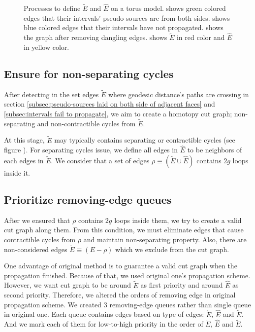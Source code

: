\documentclass[a4paper,twoside]{article}
\begin{document}
\begin{figure}[h!]
	\caption[]{Processes to define $\tilde{E}$ and $\hat{E}$ on a torus model.  shows green colored edges that their intervals' pseudo-sources are from both sides.  shows blue colored edges that their intervals have not propagated.  shows the graph after removing dangling edges.  shows $\tilde{E}$ in red color and $\hat{E}$ in  yellow color.}
	\label{fig:fig-torus_edges_detected}
\end{figure}

\subsection{Ensure for non-separating cycles}
\label{subsec:ensure non-trivia}
After detecting in the set edges $\tilde{E}$ where geodesic distance's paths are crossing in section \ref{subsec:pseudo-sources laid on both side of adjacent faces} and \ref{subsec:intervals fail to propagate}, we aim to create a homotopy cut graph; non-separating and non-contractible cycles from $\tilde{E}$.

At this stage, $\tilde{E}$ may typically contains separating or contractible cycles (see figure ).  For separating cycles issue, we define all edges in $\hat{E}$ to be neighbors of each edges in $\tilde{E}$. We consider that a set of edges $\rho \equiv (\tilde{E} \cup \hat{E})$ contains $2g$ loops inside it.  

\subsection{Prioritize removing-edge queues}
After we ensured that $\rho$ contains $2g$ loops inside them, we try to create a valid cut graph along them. From this condition, we must eliminate edges that cause contractible cycles from $\rho$ and maintain non-separating property. Also, there are non-considered edges $\acute{E} \equiv (E - \rho)$ which we exclude from the cut graph.

One advantage of original method is to guarantee a valid cut graph when the propagation finished. Because of that, we used original one's propagation scheme. However, we want cut graph to be around $\tilde{E}$ as first priority and around $\hat{E}$ as second priority. Therefore, we altered the orders of removing edge in original propagation scheme. We created 3 removing-edge queues rather than single queue in original one. Each queue contains edges based on type of edges: 
$\acute{E}$, $\hat{E}$ and $\tilde{E}$.  And we mark each of them for low-to-high priority in the order of $\acute{E}$, $\hat{E}$ and $\tilde{E}$.
\end{document}
